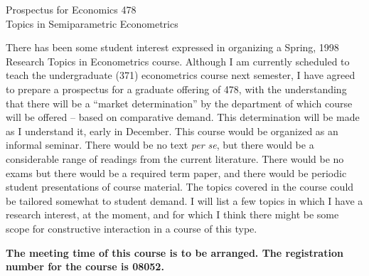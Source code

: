 \documentclass{article}
\begin{document}
\begin{center}
\large{
{ Prospectus for Economics 478 \\
Topics in Semiparametric Econometrics}}
\end{center}

\vspace{3mm}
There has been some student interest expressed in organizing a Spring, 1998
Research Topics in Econometrics course.  
Although I am currently scheduled to teach the undergraduate (371)
econometrics course next semester, I have agreed to prepare a prospectus
for a graduate offering of 478, with the understanding that there will
be a ``market determination'' by the department of which course will
be offered  -- based on comparative demand.  This determination will be made
as I understand it, early in December.  
This course would be organized as an informal seminar.  
There would be no text 
{\em per se}, but there would be a considerable range of readings from the 
current literature.  
There would be no exams but there would be a required term paper,
and there would be periodic student presentations of course material.
The topics covered in the course could be tailored somewhat to student
demand.  I will list a few topics in which I have a research interest,
at the moment, and for which I think there might be some scope for
constructive interaction in a course of this type.

{\bf The meeting time of this course is to be arranged.  The registration 
number for the course is 08052.}
\end{document}
